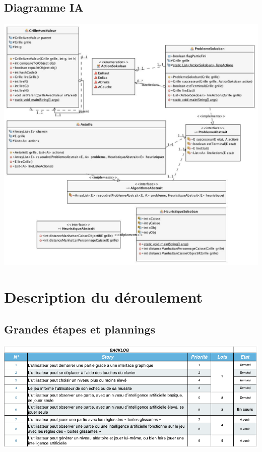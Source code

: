 \documentclass[a4paper,12pt]{article} %
\begin{document}
\subsection{Diagramme IA}
\includegraphics[scale=0.46]{ia2.jpg}
\newpage
\section{Description du déroulement} 
\subsection{Grandes étapes et plannings}
\begin{center} \includegraphics[scale=0.7]{backlogfinal.png} \end{center}

\newpage
\end{document}
